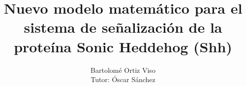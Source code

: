 \documentclass[a4paper,12pt,twoside]{report}
\begin{document}
	


\title{\LARGE {\bf Nuevo modelo matemático para el sistema de señalización de la proteína Sonic Heddehog (Shh) }\\
 \vspace*{6mm}
}

\author{Bartolomé Ortiz Viso\\Tutor: Óscar Sánchez }

\narrowlinespacing
\maketitle

\preface




\body





\appendix




\end{document}
